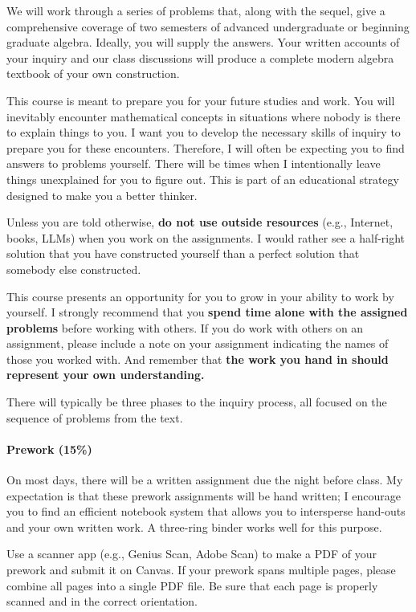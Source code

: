 \documentclass[
  twoside]{article}
\begin{document}
We will work through a series of problems that, along with the sequel,
give a comprehensive coverage of two semesters of advanced undergraduate
or beginning graduate algebra. Ideally, you will supply the answers.
Your written accounts of your inquiry and our class discussions will
produce a complete modern algebra textbook of your own construction.

This course is meant to prepare you for your future studies and work.
You will inevitably encounter mathematical concepts in situations where
nobody is there to explain things to you. I want you to develop the
necessary skills of inquiry to prepare you for these encounters.
Therefore, I will often be expecting you to find answers to problems
yourself. There will be times when I intentionally leave things
unexplained for you to figure out. This is part of an educational
strategy designed to make you a better thinker.

Unless you are told otherwise, \textbf{do not use outside resources}
(e.g., Internet, books, LLMs) when you work on the assignments. I would
rather see a half-right solution that you have constructed yourself than
a perfect solution that somebody else constructed.

This course presents an opportunity for you to grow in your ability to
work by yourself. I strongly recommend that you
\textbf{spend time alone with the assigned problems} before working with
others. If you do work with others on an assignment, please include a
note on your assignment indicating the names of those you worked with.
And remember that
\textbf{the work you hand in should represent your own understanding.}

There will typically be three phases to the inquiry process, all focused
on the sequence of problems from the text.

\paragraph{Prework (15\%)}\label{prework-15}

On most days, there will be a written assignment due the night before
class. My expectation is that these prework assignments will be hand
written; I encourage you to find an efficient notebook system that
allows you to intersperse hand-outs and your own written work. A
three-ring binder works well for this purpose.

Use a scanner app (e.g., Genius Scan, Adobe Scan) to make a PDF of your
prework and submit it on Canvas. If your prework spans multiple pages,
please combine all pages into a single PDF file. Be sure that each page
is properly scanned and in the correct orientation.
\end{document}
